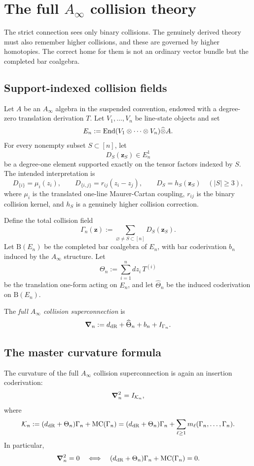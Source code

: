\section{The full $A_\infty$ collision theory}%

The strict connection sees only binary collisions. The genuinely derived theory must also remember higher collisions, and these are governed by higher homotopies. The correct home for them is not an ordinary vector bundle but the completed bar coalgebra.

\subsection{Support-indexed collision fields}
Let $A$ be an $A_\infty$ algebra in the suspended convention, endowed with a degree-zero translation derivation $T$. Let $V_1,\dots,V_n$ be line-state objects and set
\[
 E_n:=\mathrm{End}(V_1\otimes\cdots\otimes V_n)\widehat\otimes A.
\]
For every nonempty subset $S\subset[n]$, let
\[
 D_S(\mathbf z_S)\in E_n^1
\]
be a degree-one element supported exactly on the tensor factors indexed by $S$. The intended interpretation is
\[
 D_{\{i\}}=\mu_i(z_i),
 \qquad
 D_{\{i,j\}}=r_{ij}(z_i-z_j),
 \qquad
 D_S=h_S(\mathbf z_S)\quad (|S|\ge 3),
\]
where $\mu_i$ is the translated one-line Maurer-Cartan coupling, $r_{ij}$ is the binary collision kernel, and $h_S$ is a genuinely higher collision correction.

Define the total collision field
\[
 \Gamma_n(\mathbf z):=\sum_{\varnothing\neq S\subset[n]}D_S(\mathbf z_S).
\]
Let $\mathrm B(E_n)$ be the completed bar coalgebra of $E_n$, with bar coderivation $b_n$ induced by the $A_\infty$ structure. Let
\[
 \Theta_n:=\sum_{i=1}^n dz_i\,T^{(i)}
\]
be the translation one-form acting on $E_n$, and let $\widehat\Theta_n$ be the induced coderivation on $\mathrm B(E_n)$.

\begin{definition}%
The \emph{full $A_\infty$ collision superconnection} is
\[
 \boldsymbol{\nabla}_n := d_{\mathrm{dR}} + \widehat\Theta_n + b_n + I_{\Gamma_n}.
\]
\end{definition}

\subsection{The master curvature formula}

\begin{theorem}%
The curvature of the full $A_\infty$ collision superconnection is again an insertion coderivation:
\[
 \boldsymbol{\nabla}_n^2 = I_{\mathcal K_n},
\]
where
\[
 \mathcal K_n := (d_{\mathrm{dR}}+\Theta_n)\Gamma_n + \mathrm{MC}(\Gamma_n)
 = (d_{\mathrm{dR}}+\Theta_n)\Gamma_n + \sum_{\ell\ge 1} m_\ell(\Gamma_n,\dots,\Gamma_n).
\]
In particular,
\[
 \boldsymbol{\nabla}_n^2=0
 \quad\Longleftrightarrow\quad
 (d_{\mathrm{dR}}+\Theta_n)\Gamma_n+\mathrm{MC}(\Gamma_n)=0.
\]
\end{theorem}

